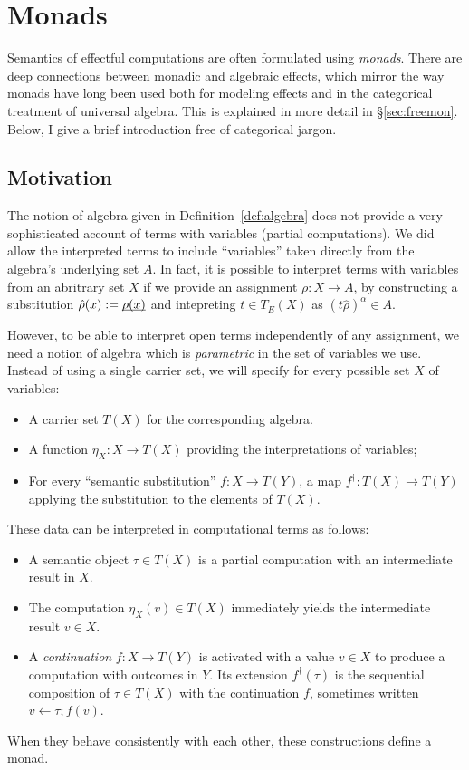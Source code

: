 \documentclass[11pt,oneside,draft]{book}
\theoremstyle{definition}
\newcommand{\ul}[1]{%
  \underline{\smash{#1}}
}
\begin{document}


\section{Monads} \label{sec:eff:mon} %

Semantics of effectful computations
are often formulated using \emph{monads}.
There are deep connections between
monadic and algebraic effects,
which mirror the way monads have long been used
both for modeling effects and
in the categorical treatment of universal algebra.
This is explained in more detail in \S\ref{sec:freemon}.
Below, I give a brief introduction
free of categorical jargon.

\subsection{Motivation} %

The notion of algebra
given in Definition~\ref{def:algebra}
does not provide a very sophisticated account
of terms with variables
(partial computations).
We did allow the interpreted terms to include ``variables''
taken directly from the algebra's underlying set $A$.
In fact, it is possible to interpret
terms with variables from an abritrary set $X$
if we provide an assignment $\rho : X \rightarrow A$,
by constructing a substitution $\hat{\rho}(x) := \ul{\rho(x)}$
and intepreting $t \in T_E(X)$ as $(t \hat{\rho})^\alpha \in A$.

However,
to be able to interpret open terms
independently of any assignment,
we need a notion of algebra which is \emph{parametric}
in the set of variables we use.
Instead of using a single carrier set,
we will specify for every possible
set $X$ of variables:
\begin{itemize}
  \item A carrier set $T(X)$ for the corresponding algebra.
  \item A function $\eta_X : X \rightarrow T(X)$
    providing the interpretations of variables;
  \item For every ``semantic substitution''
    $f : X \rightarrow T(Y)$,
    a map $f^\dagger : T(X) \rightarrow T(Y)$
    applying the substitution to the elements of $T(X)$.
\end{itemize}
These data can be interpreted in computational terms as follows:
\begin{itemize}
  \item
    A semantic object $\tau \in T(X)$
    is a partial computation
    with an intermediate result in $X$.
  \item
    The computation $\eta_X(v) \in T(X)$
    immediately yields the intermediate result $v \in X$.
  \item
    A \emph{continuation} $f : X \rightarrow T(Y)$
    is activated with a value $v \in X$
    to produce a computation with outcomes in $Y$.
    Its extension $f^\dagger(\tau)$
    is the sequential composition
    of $\tau \in T(X)$
    with the continuation $f$,
    sometimes written
    $v \mathbin{\leftarrow} \tau \mathbin{;} f(v)$.
\end{itemize}
When they behave consistently with each other,
these constructions define a monad.
\end{document}
